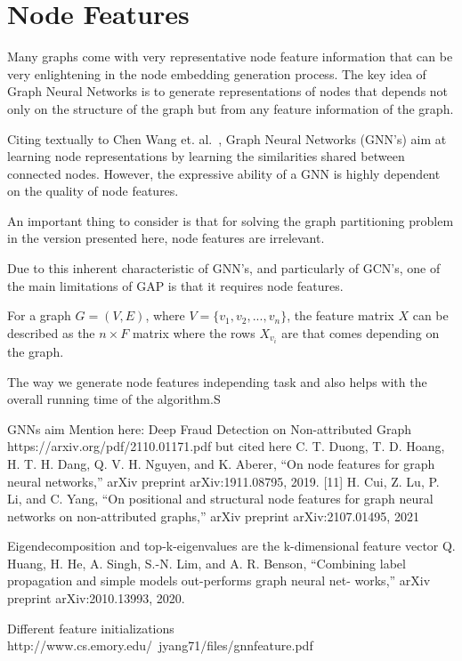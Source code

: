\section{Node Features}
Many graphs come with very representative node feature information that can be very enlightening in the node embedding generation process. The key idea of Graph Neural Networks is to generate representations of nodes that depends not only on the structure of the graph but from any feature information of the graph. 

Citing textually to Chen Wang et. al.~\cite{nodefeatures}, Graph Neural Networks (GNN's) aim at learning node representations by learning the similarities shared between connected nodes. However, the expressive ability of a GNN is highly dependent on the quality of node features.

An important thing to consider is that for solving the graph partitioning problem in the version presented here, node features are irrelevant.

Due to this inherent characteristic of GNN's, and particularly of GCN's, one of the main limitations of GAP is that it requires node features.

For a graph $G = (V,E)$, where $V=\{v_1, v_2, ..., v_n\}$, the feature matrix $X$ can be described as the $n\times F$ matrix where the rows $X_{v_i}$ are that comes depending on the graph.

The way we generate node features independing task and also helps with the overall running time of the algorithm.S

GNNs aim 
Mention here: Deep Fraud Detection on Non-attributed Graph
https://arxiv.org/pdf/2110.01171.pdf
but cited here
C. T. Duong, T. D. Hoang, H. T. H. Dang, Q. V. H. Nguyen, and
K. Aberer, “On node features for graph neural networks,” arXiv preprint
arXiv:1911.08795, 2019.
[11] H. Cui, Z. Lu, P. Li, and C. Yang, “On positional and structural node
features for graph neural networks on non-attributed graphs,” arXiv
preprint arXiv:2107.01495, 2021

Eigendecomposition and top-k-eigenvalues are the k-dimensional feature vector
Q. Huang, H. He, A. Singh, S.-N. Lim, and A. R. Benson, “Combining
label propagation and simple models out-performs graph neural net-
works,” arXiv preprint arXiv:2010.13993, 2020.

Different feature initializations
http://www.cs.emory.edu/~jyang71/files/gnnfeature.pdf

